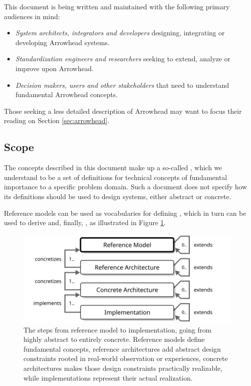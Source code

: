 This document is being written and maintained with the following primary audiences in mind:

\begin{itemize}
\item \textit{System architects, integrators and developers} designing, integrating or developing Arrowhead systems.
\item \textit{Standardization engineers and researchers} seeking to extend, analyze or improve upon Arrowhead.
\item \textit{Decision makers, users and other stakeholders} that need to understand fundamental Arrowhead concepts.
\end{itemize}

Those seeking a less detailed description of Arrowhead may want to focus their reading on Section \ref{sec:arrowhead}.

\subsection{Scope}
\label{sec:introduction:scope}

The concepts described in this document make up a so-called , which we understand to be a set of definitions for technical concepts of fundamental importance to a specific problem domain.
Such a document does not specify how its definitions should be used to design systems, either abstract or concrete.

Reference models can be used as vocabularies for defining , which in turn can be used to derive  and, finally, , as illustrated in Figure \ref{fig:reference-model}.

\begin{figure}[ht]
  \centering
  \includegraphics{figures/reference-model}
  \caption{
    The steps from reference model to implementation, going from highly abstract to entirely concrete.
    Reference models define fundamental concepts, reference architectures add abstract design constraints rooted in real-world observation or experiences, concrete architectures makes those design constraints practically realizable, while implementations represent their actual realization.
  }
  \label{fig:reference-model}
\end{figure}

